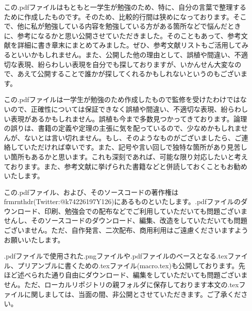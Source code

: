 \documentclass[a4paper]{jsarticle}
\begin{document}
この.pdfファイルはもともと一学生が勉強のため、特に、自分の言葉で整理するために作成したものです。そのため、比較的行間は狭めになっております。そこで、他に私が勉強している内容を勉強している方がある箇所などで悩んだときに、参考になるかと思い公開させていただきました。そのこともあって、参考文献を詳細に書き章末にまとめてみました。ぜひ、参考文献リストもご活用してみるといいかもしれません。また、公開した他の理由として、誤植や間違い、不適切な表現、紛らわしい表現を自分でも探しておりますが、いかんせん大変なので、あえて公開することで誰かが探してくれるかもしれないというのもございます。\par
この.pdfファイルは一学生が勉強のため作成したもので監修を受けたわけではないので、正確性については保証できなく誤植や間違い、不適切な表現、紛らわしい表現があるかもしれません。誤植も今まで多数見つかってきております。論理の誤りは、書籍の定義や定理の主張に気を配っているので、少なめかもしれませんが、ないとは言い切れません。もし、そのようなものがございましたら、ご連絡していただければ幸いです。また、記号や言い回しで独特な箇所があり見苦しい箇所もあるかと思います。これも深刻であれば、可能な限り対応したいと考えております。また、参考文献に挙げられた書籍などと併読しておくこともお勧めいたします。\par
この.pdfファイル、および、そのソースコードの著作権はfrmrnthdr(Twitter:@k74226197Y126)にあるものといたします。.pdfファイルのダウンロード、印刷、勉強会での配布などでご利用していただいても問題ございませんし、そのソースコードのダウンロード、編集、改造をしていただいても問題ございません。ただ、自作発言、二次配布、商用利用はご遠慮くださいますようお願いいたします。\par
.pdfファイルで使用された.pngファイルや.pdfファイルのベースとなる.texファイル、プリアンブルに書くための.texファイル(macro.tex)も公開しております。先ほど述べられた通り自由にダウンロード、編集をしていただいても問題ございません。ただ、ローカルリポジトリの親フォルダに保存しております本文の.texファイルに関しましては、当面の間、非公開とさせていただきます。ご了承ください。
\end{document}
